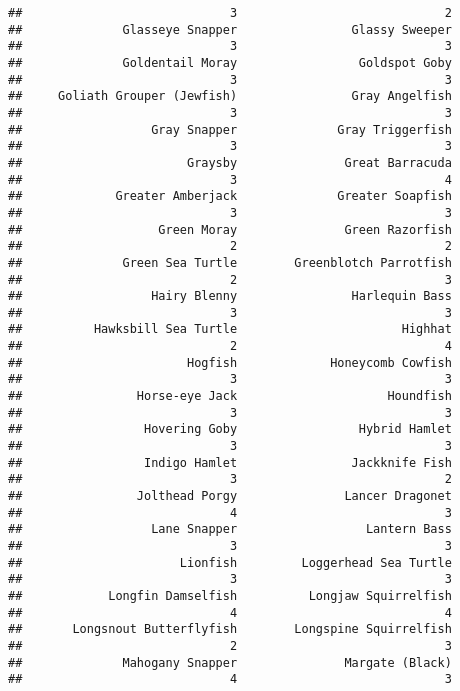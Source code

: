 \documentclass[
]{article}
\begin{document}
\begin{verbatim}
##                             3                             2 
##              Glasseye Snapper                Glassy Sweeper 
##                             3                             3 
##              Goldentail Moray                 Goldspot Goby 
##                             3                             3 
##     Goliath Grouper (Jewfish)                Gray Angelfish 
##                             3                             3 
##                  Gray Snapper              Gray Triggerfish 
##                             3                             3 
##                       Graysby               Great Barracuda 
##                             3                             4 
##             Greater Amberjack              Greater Soapfish 
##                             3                             3 
##                   Green Moray               Green Razorfish 
##                             2                             2 
##              Green Sea Turtle        Greenblotch Parrotfish 
##                             2                             3 
##                  Hairy Blenny                Harlequin Bass 
##                             3                             3 
##          Hawksbill Sea Turtle                       Highhat 
##                             2                             4 
##                       Hogfish             Honeycomb Cowfish 
##                             3                             3 
##                Horse-eye Jack                     Houndfish 
##                             3                             3 
##                 Hovering Goby                 Hybrid Hamlet 
##                             3                             3 
##                 Indigo Hamlet                Jackknife Fish 
##                             3                             2 
##                Jolthead Porgy               Lancer Dragonet 
##                             4                             3 
##                  Lane Snapper                  Lantern Bass 
##                             3                             3 
##                      Lionfish         Loggerhead Sea Turtle 
##                             3                             3 
##            Longfin Damselfish          Longjaw Squirrelfish 
##                             4                             4 
##       Longsnout Butterflyfish        Longspine Squirrelfish 
##                             2                             3 
##              Mahogany Snapper               Margate (Black) 
##                             4                             3 

\end{verbatim}
\end{document}
